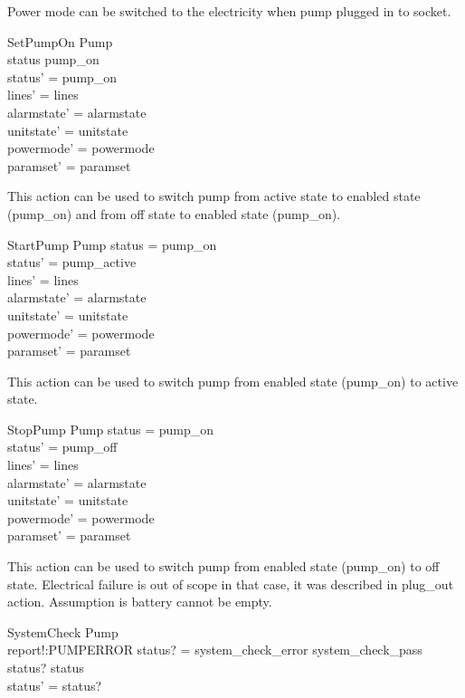 \documentclass{article}
\begin{document}
	Power mode can be switched to the electricity when pump plugged in to socket.

	\begin{schema}{SetPumpOn}
		\Delta Pump \\
	\where 
		status \neq pump\_on \\
		status' = pump\_on \\
		lines' = lines \\
    	alarmstate' = alarmstate \\
    	unitstate' = unitstate \\
    	powermode' = powermode \\
		paramset' = paramset
	\end{schema}
	
	This action can be used to switch pump from active state to enabled state (pump\_on) and from off state to enabled state (pump\_on).
	
	\begin{schema}{StartPump}
		\Delta Pump
	\where
		status = pump\_on \\ 
		status' = pump\_active \\
		lines' = lines  \\
    	alarmstate' = alarmstate \\
    	unitstate' = unitstate \\
    	powermode' = powermode \\
		paramset' = paramset
	\end{schema}
	
	This action can be used to switch pump from enabled state (pump\_on) to active state.
	
	\begin{schema}{StopPump}
		\Delta Pump
	\where
		status = pump\_on \\ 
		status' = pump\_off \\
		lines' = lines  \\
    	alarmstate' = alarmstate \\
    	unitstate' = unitstate \\
    	powermode' = powermode \\
		paramset' = paramset
	\end{schema}	
			
	This action can be used to switch pump from enabled state (pump\_on) to off state. Electrical failure is out of scope in that case, it was described 
	in plug_out action. Assumption is battery cannot be empty.		
			
	\begin{schema}{SystemCheck}
		\Delta Pump\\
		report!:PUMPERROR
	\where 
		status? = system\_check\_error \lor system\_check\_pass \\
		status? \neq status\\
		status' = status?
	\end{schema}
	
\end{document}

